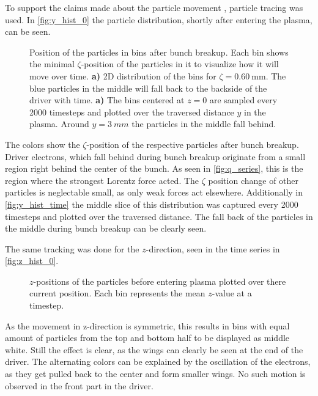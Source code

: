 \documentclass[bachelor_thesis]{subfiles}
\begin{document}
To support the claims made about the particle movement , particle tracing was used. In \autoref{fig:y_hist_0} the particle distribution, shortly after entering the plasma, can be seen.
\begin{figure}
	\centering
	\begin{subfigure}{0.45\textwidth}
	\centering
	\missingfigure{}
	\caption{} \label{fig:y_hist_0}
	\end{subfigure}
	\begin{subfigure}{0.45\textwidth}
	\centering
	\missingfigure{}
	\caption{} \label{fig:y_hist_time}
	\end{subfigure}
	\caption{Position of the particles in bins after bunch breakup. Each bin shows the minimal $\zeta$-position of the particles in it to visualize how it will move over time.
	\textbf{a)} 2D distribution of the bins for $\zeta=\qty{0.60}{\mm}$. The blue particles in the middle will fall back to the backside of the driver with time.
	\textbf{a)} The bins centered at $z=0$ are sampled every 2000 timesteps and plotted over the traversed distance $y$ in the plasma. Around $y=\qty{3}{mm}$ the particles in the middle fall behind.}
	\label{fig:y_hist}
\end{figure}
The colors show the $\zeta$-position of the respective particles after bunch breakup. Driver electrons, which fall behind during bunch breakup originate from a small region right behind the center of the bunch. 
As seen in \autoref{fig:q_series}, this is the region where the strongest Lorentz force acted.
The $\zeta$ position change of other particles is neglectable small, as only weak forces act elsewhere.
Additionally in \autoref{fig:y_hist_time} the middle slice of this distribution was captured every 2000 timesteps and plotted over the traversed distance. The fall back of the particles in the middle during bunch breakup can be clearly seen.

The same tracking was done for the $z$-direction, seen in the time series in \autoref{fig:z_hist_0}.
\begin{figure}
	\centering
	\missingfigure{}
	\caption{$z$-positions of the particles before entering plasma plotted over there current position. Each bin represents the mean $z$-value at a timestep. }
	\label{fig:z_hist_0}
\end{figure}
As the movement in z-direction is symmetric, this results in bins with equal amount of particles from the top and bottom half to be displayed as middle white. Still the effect is clear, as the wings can clearly be seen at the end of the driver.
The alternating colors can be explained by the oscillation of the electrons, as they get pulled back to the center and form smaller wings. No such motion is observed in the front part in the driver.
\end{document}
